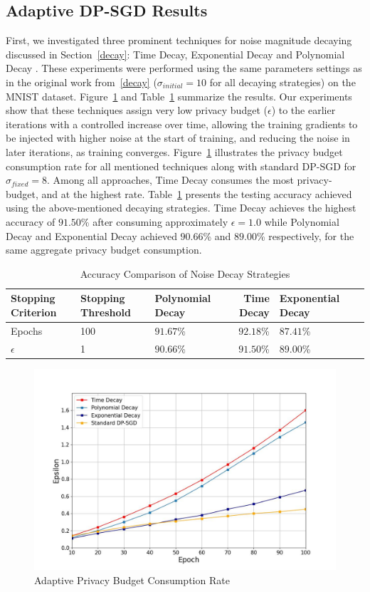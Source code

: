 \subsection{Adaptive DP-SGD Results}
First, we investigated three prominent techniques for noise magnitude decaying discussed in Section~\ref{decay}: Time Decay, Exponential Decay and Polynomial Decay \cite{RefWorks:RefID:47-yu2019differentially}. These experiments were performed using the same parameters settings as in the original work from~\ref{decay} ($\sigma_{initial} = 10$  for all decaying strategies) on the MNIST dataset. Figure~\ref{decayRate} and Table~\ref{tab: decayAcc} summarize the results. Our experiments show that these techniques assign very low privacy budget ($\epsilon$) to the earlier iterations with a controlled increase over time, allowing the training gradients to be injected with higher noise at the start of training, and reducing the noise in later iterations, as training converges. Figure~\ref{decayRate} illustrates the privacy budget consumption rate for all mentioned techniques along with standard DP-SGD for $\sigma_{fixed}=8$. Among all approaches, Time Decay consumes the most privacy-budget, and at the highest rate. Table~\ref{tab: decayAcc} presents the testing accuracy achieved using the above-mentioned decaying strategies. Time Decay achieves the highest accuracy of $91.50$\% after consuming approximately $\epsilon = 1.0$ while Polynomial Decay and Exponential Decay achieved $90.66$\% and $89.00$\% respectively, for the same aggregate privacy budget consumption.

\begin{table}[!htp]\centering
\caption{Accuracy Comparison of Noise Decay Strategies}\label{tab: decayAcc}
\scriptsize
\begin{tabular}{|p{1.7cm}|p{1.7cm}|p{1.7cm}|r|p{1.7cm}|p{1.7cm}|}\toprule
\hline
\textbf{Stopping Criterion} &\textbf{Stopping Threshold} &\textbf{Polynomial Decay} &\textbf{Time Decay} &\textbf{Exponential Decay}  \\\midrule
\hline
Epochs &100 &$91.67$\% &$92.18$\% &$87.41$\% \\
\hline
\large $\epsilon$ &1 &$90.66$\% &$91.50$\% &$89.00$\% \\
\hline
\bottomrule
\end{tabular}
\end{table}

\begin{figure}[h]
\centering
        \includegraphics[width=0.7\linewidth]{submissions/submission5/figs/epsDecay.jpg}
   \caption{Adaptive Privacy Budget Consumption Rate}\label{FigDiff}
   \label{decayRate}
\end{figure} 

